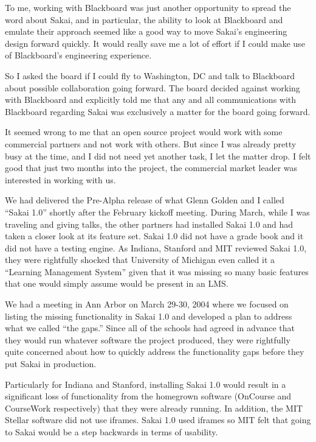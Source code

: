 \documentclass[12pt]{book}
\begin{document}
To me, working with Blackboard was just another
opportunity to spread the word about Sakai, and in particular,
the ability to look at Blackboard and emulate their
approach seemed like a good way to move Sakai's engineering design
forward quickly. It would really save me a lot of
effort if I could make use of Blackboard's engineering experience.

So I asked the board if I could fly to Washington, DC and talk to
Blackboard about possible collaboration going forward.  The
board decided against working
with Blackboard and explicitly told me
that any and all communications with Blackboard regarding
Sakai was exclusively a matter for the board going forward.

It seemed wrong to me that an open source project would work with
some commercial partners and not work with others.
But since I was already pretty busy at the time, and I did not need
yet another task, I let the matter drop.  I felt good that
just two months into the project, the commercial market leader
was interested in working with us.

We had delivered the Pre-Alpha release of what Glenn Golden and I
called ``Sakai 1.0'' shortly after the February kickoff meeting.
During March, while I was traveling and giving talks,
the other partners had installed Sakai 1.0
and had taken a closer look at its feature set.
Sakai 1.0 did not have a grade book and it did not have a testing engine.
As Indiana, Stanford and MIT reviewed Sakai 1.0, they
were rightfully shocked that University of Michigan even called
it a ``Learning Management System'' given that it was missing so
many basic features that one would simply assume would be
present in an LMS.


We had a meeting in Ann Arbor on March 29-30, 2004 where we focused
on listing the missing functionality in Sakai 1.0 and developed
a plan to address what we called ``the gaps.''  Since all of
the schools had agreed in advance that they would run whatever
software the project produced, they were rightfully quite concerned
about how to quickly address the functionality gaps before
they put Sakai in production.

Particularly for Indiana and Stanford, installing Sakai 1.0 would
result in a significant loss of functionality from the homegrown
software (OnCourse and CourseWork respectively) that they were
already running.  In addition, the MIT Stellar software did not use iframes.
Sakai 1.0 used iframes so MIT felt that going to Sakai would be
a step backwards in terms of usability.
\end{document}
